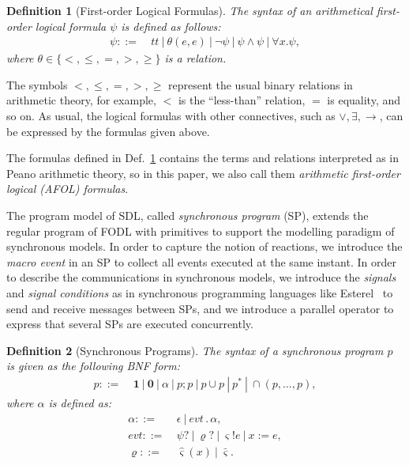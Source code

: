 \documentclass{fcs}
\newtheorem{mydef}{Definition}[section]
\newcommand{\sig}[0]{\varsigma}
\newcommand{\act}[0]{\mathit{evt}}
\newcommand{\noth}[0]{\mathbf{1}}
\newcommand{\halt}[0]{\mathbf{0}}
\newcommand{\true}[0]{\mathit{tt}}
\newcommand{\false}[0]{\mathit{ff}}
\DeclareMathOperator{\seq}{;}
\DeclareMathOperator{\cho}{\cup}
\DeclareMathOperator{\para}{\cap}
\DeclareMathOperator{\nex}{.}
\newcommand{\ddef}[0]{::=}
\begin{document}
\begin{mydef}[First-order Logical Formulas]
\label{def:First-order Logical Formulas}
	The syntax of an arithmetical first-order logical formula $\psi$ is defined as follows:
	$$\begin{aligned}
	\psi \ddef &\ \true\ |\ \theta(e, e)\ |\ \neg \psi\ |\ \psi\wedge \psi\ |\ \forall x. \psi,
	\end{aligned}$$
where %
$\theta\in \{<, \le, =, >, \ge\}$ is a relation.
\end{mydef}
The symbols $<, \le, =, >, \ge$ represent the usual binary relations in arithmetic theory, for example, $<$ is the ``less-than'' relation, $=$ is equality, and so on.
As usual, the logical formulas with other connectives, such as $\vee, \exists, \to$, can be expressed by the formulas given above.

The formulas defined in Def.~\ref{def:First-order Logical Formulas} contains the terms and relations interpreted as in Peano arithmetic theory, so
in this paper, we also call them \emph{arithmetic first-order logical (AFOL) formulas}.





The program model of SDL, called \emph{synchronous program} (SP), extends the regular program of FODL with primitives to support the modelling paradigm of synchronous models.
In order to capture the notion of reactions, we introduce the \emph{macro event} in an SP to collect all events executed at the same instant.
In order to describe the communications in synchronous models, we introduce the  \emph{signals} and \emph{signal conditions} as in synchronous programming languages like Esterel~\cite{Berry92} to send and receive messages between SPs,
and we introduce a parallel operator to express that several SPs are executed concurrently.



\begin{mydef}[Synchronous Programs]
\label{definition: Synchronous Programs}
The syntax of a synchronous program $p$ is given as the following BNF form:
$$\begin{aligned}
p\ddef &\ \noth\ |\ \halt\ |\ \alpha\ |\ p\seq p\ |\ p \cho p\ |\ p^*\ |\ \para(p,...,p),
\end{aligned}$$
where $\alpha$ is defined as:
$$\begin{aligned}
\alpha \ddef&\ \epsilon\ |\ \act\nex \alpha,\\
\act \ddef &\ \psi?\ |\ \varrho?\ |\ \sig!e\ |\ x:=e, \\
\varrho\ddef&\ \hat{\sig}(x)\ |\ \bar{\sig}.
\end{aligned}$$
\end{mydef}
\end{document}
